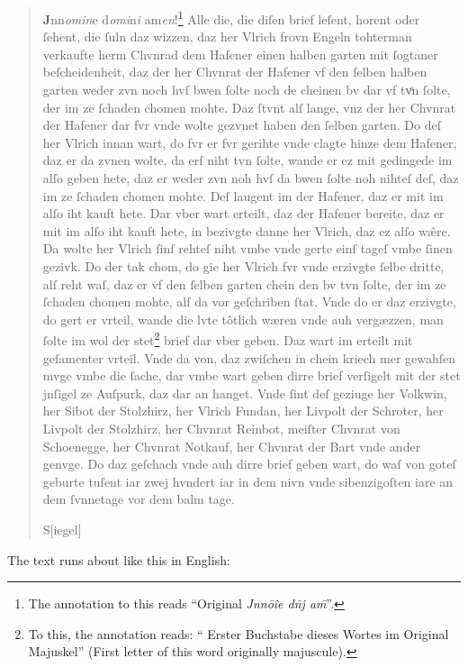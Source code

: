 \documentclass[12pt,paper=a4]{scrartcl}
\begin{document}
\blockquote{\textbf{J}nn\emph{omin}e d\emph{omi}n\emph{i} am\emph{en}!\footnote{The annotation to this reads \enquote{Original \emph{Jnnōîe dn̄j am̄}}.} Alle die, die diſen brief leſent, horent oder ſehent, die ſuln daz wizzen, daz her Vlrich frovn Engeln tohterman verkaufte herm Chvnrad dem Hafener einen halben garten mit ſogtaner beſcheidenheit, daz der her Chvnrat der Hafener vf den ſelben halben garten weder zvn noch hvſ bwen ſolte noch de cheinen bv dar vf tvͦn ſolte, der im ze ſchaden chomen mohte. Daz ſtvnt alſ lange, vnz der her Chvnrat der Hafener dar fvr vnde wolte gezvnet haben den ſelben garten. Do deſ her Vlrich innan wart, do fvr er fvr gerih\-te vnde clagte hinze dem Hafener, daz er da zvnen wolte, da erſ niht tvn ſolte, wande er ez mit gedingede im alſo geben hete, daz er weder zvn noh hvſ da bwen ſolte noh nihteſ deſ, daz im ze ſchaden chomen mohte. Deſ laugent im der Hafener, daz er mit im alſo iht kauft hete. Dar vber wart erteilt, daz der Hafener bereite, daz er mit im alſo iht kauft hete, in bezivgte danne her Vlrich, daz ez alſo wæ̂re. Da wolte her Vlrich ſinſ rehteſ niht vmbe vnde gerte einſ tageſ vmbe ſinen gezivk. Do der tak chom, do gie her Vlrich fvr vnde erzivgte ſelbe dritte, alſ reht waſ, daz er vf den ſelben garten chein den bv tvn ſolte, der im ze ſchaden chomen mohte, alſ da vor geſchriben ſtat. Vnde do er daz erzivgte, do gert er vrteil, wande die lvte tôtlich wæren vnde auh vergæzzen, man ſolte im wol der stet\footnote{To this, the annotation reads: \enquote{\label{fn:2} Erster Buchstabe dieses Wortes im Original Majuskel} (First letter of this word originally majuscule).} brief dar vber geben. Daz wart im erteilt mit geſamenter vrteil. Vnde da von, daz zwiſchen in chein kriech mer gewahſen mvge vmbe die ſache, dar vmbe wart geben dirre brief verſigelt mit der stet jnſigel ze Auſpurk, daz dar an hanget. Vnde ſint deſ ge\-ziu\-ge her Volkwin, her Sibot der Stolzhirz, her Vlrich Fundan, her Livpolt der Schroter, her Livpolt der Stolzhirz, her Chvnrat Reinbot, meiſter Chvnrat von Schoenegge, her Chvnrat Notkauf, her Chvnrat der Bart vnde ander genvge. Do daz geſchach vnde auh dirre brief geben wart, do waſ von goteſ geburte tuſent iar zwej hvndert iar in dem nivn vnde sibenzigoſten iare an dem ſvnnetage vor dem balm tage.
\begin{center}
S[iegel]
\end{center}}

The text runs about like this in English:
\end{document}
